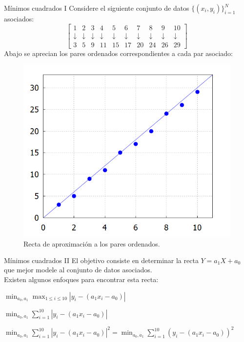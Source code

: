 \begin{frame}{Mínimos cuadrados I}
Considere el siguiente conjunto de datos $\{(x_i,y_i)\}_{i=1}^{N}$ asociados:
\begin{displaymath}
\begin{bmatrix}
1&2&3&4&5&6&7&8&9&10\\
\downarrow &\downarrow &\downarrow &\downarrow &\downarrow &\downarrow &\downarrow &\downarrow &\downarrow &\downarrow\\
3&5&9&11&15&17&20&24&26&29
\end{bmatrix}
\end{displaymath}
Abajo se aprecian los pares ordenados correspondientes a cada par asociado:
\begin{figure}[H]
\includegraphics[scale=0.55]{Imagen2}
\caption{Recta de aproximación a los pares ordenados.}
\end{figure}
\end{frame}
\begin{frame}{Mínimos cuadrados II}
\indent El objetivo consiste en determinar la recta $Y=a_1X+a_0$ que mejor modele al conjunto de datos asociados.\\
\indent Existen algunos enfoques para encontrar esta recta:
\begin{Def}
\centering $\displaystyle \min_{a_0,a_1}\max_{1\leq i\leq 10}|y_i-(a_1x_i-a_0)|$
\end{Def}
\begin{Def}
\centering $\displaystyle \min_{a_0,a_1}\sum_{i=1}^{10}|y_i-(a_1x_i-a_0)|$
\end{Def}
\begin{Def}
\centering $\displaystyle \min_{a_0,a_1}\sum_{i=1}^{10}|y_i-(a_1x_i-a_0)|^2=\displaystyle \min_{a_0,a_1}\sum_{i=1}^{10}(y_i-(a_1x_i-a_0))^2$
\end{Def}
\end{frame}
